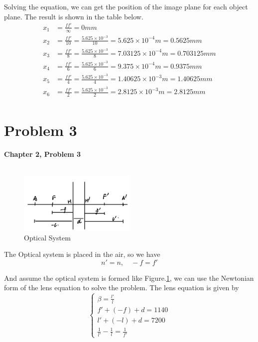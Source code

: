 \documentclass{article}
\begin{document}
Solving the equation, we can get the position of the image plane for each object plane. The result is shown in the table below.
\begin{align}
    x_1 & =\frac{ff'}{\infty} = 0mm                                                             \\
    x_2 & = \frac{ff'}{10} = \frac{5.625\times 10^{-3}}{10} = 5.625\times 10^{-4}m = 0.5625mm   \\
    x_3 & = \frac{ff'}{8} = \frac{5.625\times 10^{-3}}{8} = 7.03125\times 10^{-4}m = 0.703125mm \\
    x_4 & = \frac{ff'}{6} = \frac{5.625\times 10^{-3}}{6} = 9.375\times 10^{-4}m = 0.9375mm     \\
    x_5 & = \frac{ff'}{4} = \frac{5.625\times 10^{-3}}{4} = 1.40625\times 10^{-3}m = 1.40625mm  \\
    x_6 & = \frac{ff'}{2} = \frac{5.625\times 10^{-3}}{2} = 2.8125\times 10^{-3}m = 2.8125mm    \\
\end{align}

\section{Problem 3}
\textbf{Chapter 2, Problem 3}\\\\

\begin{figure}[H]
    \centering
    \includegraphics[width=0.5\textwidth]{image/hw2/hw2_2_1.jpeg}
    \caption{Optical System}
    \label{fig:optical_system}
\end{figure}

The Optical system is placed in the air, so we have
\begin{equation}
    n'=n,\quad -f=f'
\end{equation}

And assume the optical system is formed like Figure.\ref{fig:optical_system}, we can use the Newtonian form of the lens equation to solve the problem. The lens equation is given by
\begin{equation}
    \begin{cases}
        \beta = \frac{l'}{l} \\
        f'+(-f)+d = 1140     \\
        l'+(-l)+d=7200       \\
        \frac{1}{l'}-\frac{1}{l} = \frac{1}{f'}
    \end{cases}
\end{equation}
\end{document}
